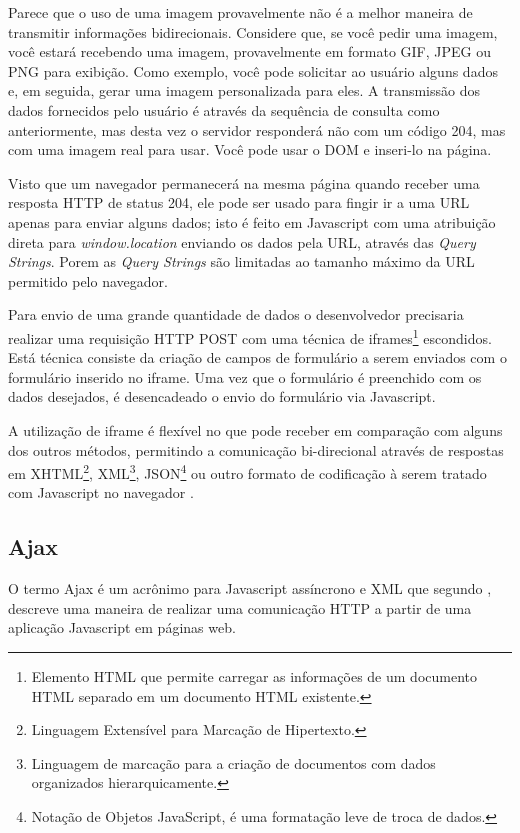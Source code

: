 \begin{citacao}
	Parece que o uso de uma imagem provavelmente não é a melhor maneira de transmitir informações bidirecionais. Considere que, se você pedir uma imagem, você estará recebendo uma imagem, provavelmente em formato GIF, JPEG ou PNG para exibição. Como exemplo, você pode solicitar ao usuário alguns dados e, em seguida, gerar uma imagem personalizada para eles. A transmissão dos dados fornecidos pelo usuário é através da sequência de consulta como anteriormente, mas desta vez o servidor responderá não com um código 204, mas com uma imagem real para usar. Você pode usar o DOM e inseri-lo na página.
\end{citacao}

Visto que um navegador permanecerá na mesma página quando receber uma resposta HTTP de status 204, ele pode ser usado para fingir ir a uma URL apenas para enviar alguns dados; isto é feito em Javascript com uma atribuição direta para \emph{window.location} enviando os dados pela URL, através das \emph{Query Strings}. Porem as \emph{Query Strings} são limitadas ao tamanho máximo da URL permitido pelo navegador.

Para envio de uma grande quantidade de dados o desenvolvedor precisaria realizar uma requisição HTTP POST com uma técnica de iframes\footnote{Elemento HTML que permite carregar as informações de um documento HTML separado em um documento HTML existente.} escondidos. Está técnica consiste da criação de campos de formulário a serem enviados com o formulário inserido no iframe. Uma vez que o formulário é preenchido com os dados desejados, é desencadeado o envio do formulário via Javascript.

A utilização de iframe é flexível no que pode receber em comparação com alguns dos outros métodos, permitindo a comunicação bi-direcional através de respostas em XHTML\footnote{Linguagem Extensível para Marcação de Hipertexto.}, XML\footnote{Linguagem de marcação para a criação de documentos com dados organizados hierarquicamente.}, JSON\footnote{Notação de Objetos JavaScript, é uma formatação leve de troca de dados.} ou outro formato de codificação à serem tratado com Javascript no navegador \cite{powell2008ajax}.

\subsection{Ajax}

O termo Ajax é um acrônimo para Javascript assíncrono e XML que segundo , descreve uma maneira de realizar uma comunicação HTTP a partir de uma aplicação Javascript em páginas web.

